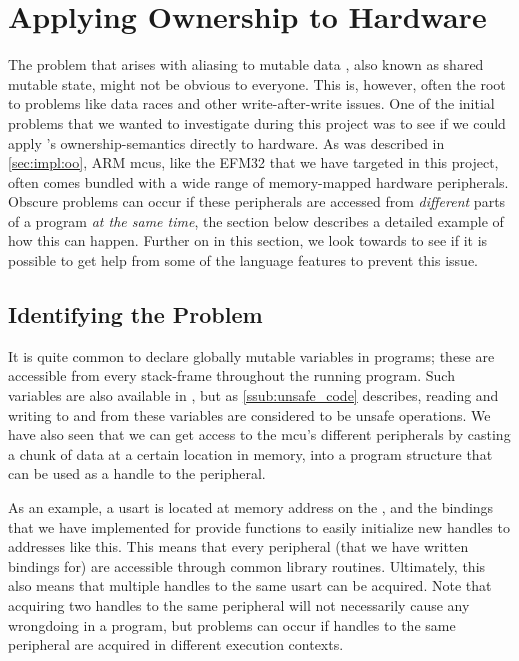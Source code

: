
\section{Applying Ownership to Hardware}
\label{sec:ownership_allied_to_hardware}

The problem that arises with aliasing to mutable data \cite{web:problem_with_shared_mutability}, also known as shared mutable state, might not be obvious to everyone.
This is, however, often the root to problems like data races and other write-after-write issues.
One of the initial problems that we wanted to investigate during this project was to see if we could apply {\rust}'s ownership-semantics directly to hardware.
As was described in \autoref{sec:impl:oo}, ARM \glspl{mcu}, like the EFM32 that we have targeted in this project, often comes bundled with a wide range of memory-mapped hardware peripherals.
Obscure problems can occur if these peripherals are accessed from \emph{different} parts of a program \emph{at the same time}, the section below describes a detailed example of how this can happen.
Further on in this section, we look towards {\rust} to see if it is possible to get help from some of the language features to prevent this issue.

\subsection{Identifying the Problem}

It is quite common to declare globally mutable variables in {\C} programs; these are accessible from every stack-frame throughout the running program.
Such variables are also available in {\rust}, but as \autoref{ssub:unsafe_code} describes, reading and writing to and from these variables are considered to be unsafe operations.
We have also seen that we can get access to the \gls{mcu}'s different peripherals by casting a chunk of data at a certain location in memory, into a program structure that can be used as a handle to the peripheral.

As an example, a \gls{usart} is located at memory address  on the {\gecko}, and the bindings that we have implemented for {\emlib} provide functions to easily initialize new handles to addresses like this.
This means that every peripheral (that we have written bindings for) are accessible through common library routines.
Ultimately, this also means that multiple handles to the same \gls{usart} can be acquired.
Note that acquiring two handles to the same peripheral will not necessarily cause any wrongdoing in a program, but problems can occur if handles to the same peripheral are acquired in different execution contexts.

